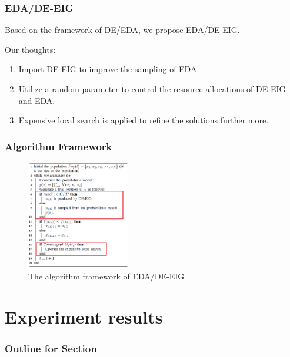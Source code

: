 \documentclass[xcolor=dvipsnames]{beamer}
\begin{document}
    \begin{frame}
    \frametitle{EDA/DE-EIG}
    Based on the framework of DE/EDA, we propose EDA/DE-EIG.

    Our thoughts:
    \begin{enumerate}
    \item Import DE-EIG to improve the sampling of EDA.
    \item Utilize a random parameter to control the resource allocations of DE-EIG and EDA.
    \item Expensive local search is applied to refine the solutions further more.
    \end{enumerate}

    \end{frame}

    \begin{frame}
    \frametitle{Algorithm Framework}
    \begin{figure}[H]
    \graphicspath{{figs/}}
    \includegraphics[width=0.4\textwidth]{edadeeig.png}
    \caption{The algorithm framework of EDA/DE-EIG}
    \end{figure}
    \end{frame}



    \section{Experiment results}
    \begin{frame}
      \frametitle{Outline for Section \thesection}
      \tableofcontents[currentsection]
    \end{frame}
\end{document}
